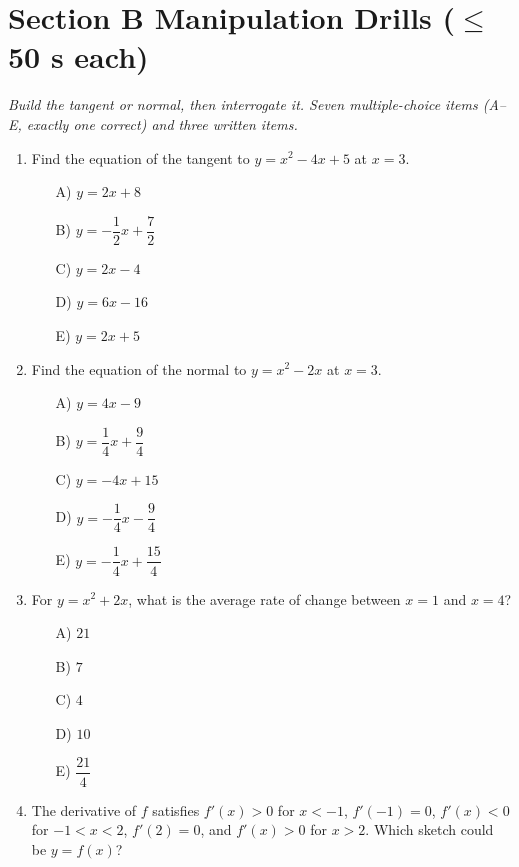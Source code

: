 \documentclass[11pt,a4paper]{article}
\begin{document}
\section*{Section B \quad Manipulation Drills \hfill{\normalfont\small($\leq$50 s each)}}

\noindent\textit{Build the tangent or normal, then interrogate it. Seven multiple-choice items (A--E, exactly one correct) and three written items.}

\begin{enumerate}

\item Find the equation of the tangent to $y=x^2-4x+5$ at $x=3$.
\begin{itemize}
\item[A)] $y=2x+8$
\item[B)] $y=-\dfrac{1}{2}x+\dfrac{7}{2}$
\item[C)] $y=2x-4$
\item[D)] $y=6x-16$
\item[E)] $y=2x+5$
\end{itemize}

\item Find the equation of the normal to $y=x^2-2x$ at $x=3$.
\begin{itemize}
\item[A)] $y=4x-9$
\item[B)] $y=\dfrac{1}{4}x+\dfrac{9}{4}$
\item[C)] $y=-4x+15$
\item[D)] $y=-\dfrac{1}{4}x-\dfrac{9}{4}$
\item[E)] $y=-\dfrac{1}{4}x+\dfrac{15}{4}$
\end{itemize}

\item For $y=x^2+2x$, what is the average rate of change between $x=1$ and $x=4$?
\begin{itemize}
\item[A)] $21$
\item[B)] $7$
\item[C)] $4$
\item[D)] $10$
\item[E)] $\dfrac{21}{4}$
\end{itemize}

\item The derivative of $f$ satisfies $f'(x)>0$ for $x<-1$, $f'(-1)=0$, $f'(x)<0$ for $-1<x<2$, $f'(2)=0$, and $f'(x)>0$ for $x>2$. Which sketch could be $y=f(x)$?


\end{enumerate}
\end{document}
